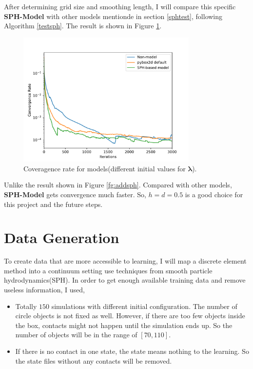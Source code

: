     After determining grid size and smoothing length, I will compare this specific \textbf{SPH-Model} with other models mentionde in section \ref{sphtest}, following Algorithm \ref{testsph}. The result is shown in Figure \ref{fig:final_test}.
     \begin{figure}[!ht]
        \centering
        \includegraphics[width=0.8\textwidth]{Figures/final_SPH.pdf}
        \caption{Coveragence rate for models(different initial values for $\pmb{\lambda}$).}
        \label{fig:final_test}
    \end{figure}
    Unlike the result shown in Figure \ref{fg:addsph}. Compared with other models, \textbf{SPH-Model} gets convergence much faster. So, $h=d=0.5$ is a good choice for this project and the future steps.

\section{Data Generation}
To create data that are more accessible to learning, I will map a discrete element method into a continuum setting use techniques from smooth particle hydrodynamics(SPH). In order to get enough available training data and remove useless information, I used,
\begin{itemize}
    \item Totally $150$ simulations with different initial configuration. The number of circle objects is not fixed as well. However, if there are too few objects inside the box, contacts might not happen until the simulation ends up. So the number of objects will be in the range of $[70, 110]$.
    \item If there is no contact in one state, the state means nothing to the learning. So the state files without any contacts will be removed.
\end{itemize}

